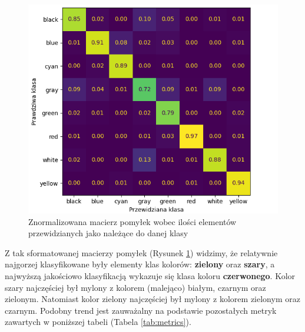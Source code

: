 \begin{figure}[h!]
    \begin{center}
        \includegraphics[scale=0.87]{img/confusion_matrix_new.png}        
    \end{center}
    \caption{Znormalizowana macierz pomyłek wobec ilości elementów przewidzianych jako należące do danej klasy}
    \label{fig:confusion_matrix_norm}
\end{figure}

\pagebreak

Z tak sformatowanej macierzy pomyłek (Rysunek \ref{fig:confusion_matrix_norm}) widzimy, że relatywnie najgorzej klasyfikowane były elementy klas kolorów: \textbf{zielony} oraz \textbf{szary}, a najwyższą jakościowo klasyfikacją wykazuje się klasa koloru \textbf{czerwonego}. Kolor szary najczęściej był mylony z kolorem (malejąco) białym, czarnym oraz zielonym. Natomiast kolor zielony najczęściej był mylony z kolorem zielonym oraz czarnym.
Podobny trend jest zauważalny na podstawie pozostałych metryk zawartych w poniższej tabeli (Tabela \ref{tab:metrics}).


